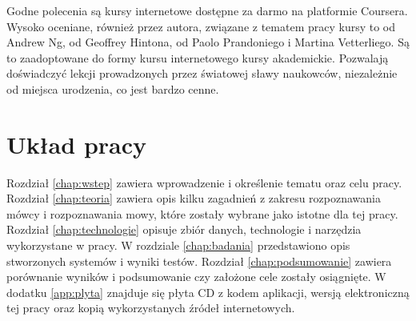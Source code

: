 Godne polecenia są kursy internetowe dostępne za darmo na platformie Coursera.
Wysoko oceniane, również przez autora, związane z tematem pracy kursy to
 od Andrew Ng, 
 od Geoffrey Hintona,
 od Paolo Prandoniego i  Martina Vetterliego.
Są to zaadoptowane do formy kursu internetowego kursy akademickie. Pozwalają 
doświadczyć lekcji prowadzonych przez światowej sławy naukowców, niezależnie
od miejsca urodzenia, co jest bardzo cenne.

\section{Układ pracy}\label{sec:uklad_pracy}

Rozdział \ref{chap:wstep} zawiera wprowadzenie i określenie tematu oraz celu
pracy. Rozdział \ref{chap:teoria} zawiera opis kilku zagadnień z zakresu
rozpoznawania mówcy i rozpoznawania mowy, które zostały wybrane jako
istotne dla tej pracy. Rozdział \ref{chap:technologie}
opisuje zbiór danych, technologie i narzędzia wykorzystane w pracy. W rozdziale
\ref{chap:badania} przedstawiono opis stworzonych systemów i wyniki testów. Rozdział
\ref{chap:podsumowanie} zawiera porównanie wyników i podsumowanie czy założone 
cele zostały osiągnięte. W dodatku \ref{app:plyta} znajduje się płyta CD z kodem aplikacji,
wersją elektroniczną tej pracy oraz kopią wykorzystanych źródeł internetowych.

